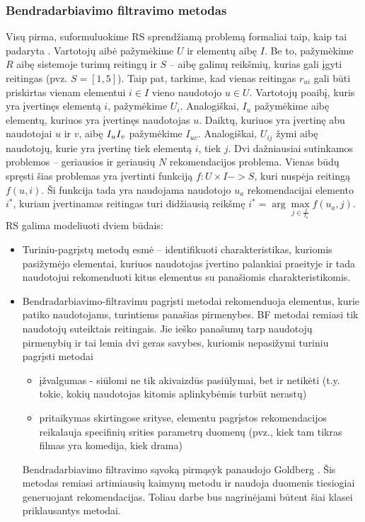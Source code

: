 \documentclass{VUMIFInfMagistrinis}
\begin{document}
\subsubsection{Bendradarbiavimo filtravimo metodas}
Visų pirma, suformuluokime RS sprendžiamą problemą formaliai taip, kaip tai padaryta \cite{2}. Vartotojų aibė pažymėkime $U$ ir elementų aibę $I$. Be to, pažymėkime $R$ aibę sistemoje turimų reitingų ir $S$ – aibę galimų reikšmių, kurias gali įgyti reitingas (pvz. $S=[1,5]$). Taip pat, tarkime, kad vienas reitingas $r_{ui}$ gali būti priskirtas vienam elementui $i \in I$ vieno naudotojo $u \in U$. Vartotojų poaibį, kuris yra įvertinęs elementą $i$, pažymėkime $U_i$. Analogiškai, $I_u$ pažymėkime aibę elementų, kuriuos yra įvertinęs naudotojas $u$. Daiktų, kuriuos yra įvertinę abu naudotojai $u$ ir $v$, aibę $I_u \relax I_v$ pažymėkime $I_{uv}$. Analogiškai, $U_{ij}$ žymi aibę naudotojų, kurie yra įvertinę tiek elementą $i$, tiek $j$. Dvi dažniausiai sutinkamos problemos – geriausios ir geriausių $N$ rekomendacijos problema. Vienas būdų spręsti šias problemas yra įvertinti funkciją $f: U \times I -> S$, kuri nuspėja reitingą $f(u,i)$. Ši funkcija tada yra naudojama naudotojo $u_a$ rekomendacijai elemento $i^*$, kuriam įvertinamas reitingas turi didžiausią reikšmę $i^*= \arg \max \limits_{j \in \frac{I}{I_u}} f(u_a,j)$. 
RS galima modeliuoti dviem būdais:
\begin{itemize}
	\item Turiniu-pagrįstų metodų esmė – identifikuoti charakteristikas, kuriomis pasižymėjo elementai, kuriuos naudotojas įvertino palankiai praeityje ir tada naudotojui rekomenduoti kitus elementus su panašiomis charakteristikomis.
	\item Bendradarbiavimo-filtravimu pagrįsti metodai rekomenduoja elementus, kurie patiko naudotojams, turintiems panašias pirmenybes. BF metodai remiasi tik naudotojų suteiktais reitingais. Jie ieško panašumų tarp naudotojų pirmenybių ir tai lemia dvi geras savybes, kuriomis nepasižymi turiniu pagrįsti metodai
	\begin{itemize}
		\item įžvalgumas - siūlomi ne tik akivaizdūs pasiūlymai, bet ir netikėti (t.y. tokie, kokių naudotojas kitomis aplinkybėmis turbūt nerastų)
		\item pritaikymas skirtingose srityse, elementu pagrįstos rekomendacijos reikalauja specifinių srities parametrų duomenų (pvz., kiek tam tikras filmas yra komedija, kiek drama)
	\end{itemize}
	Bendradarbiavimo filtravimo sąvoką pirmąsyk panaudojo Goldberg \cite{16}. Šis metodas remiasi  artimiausių kaimynų metodu ir naudoja duomenis tiesiogiai generuojant rekomendacijas. Toliau darbe bus nagrinėjami būtent šiai klasei priklausantys metodai.
\end{itemize}
\end{document}
